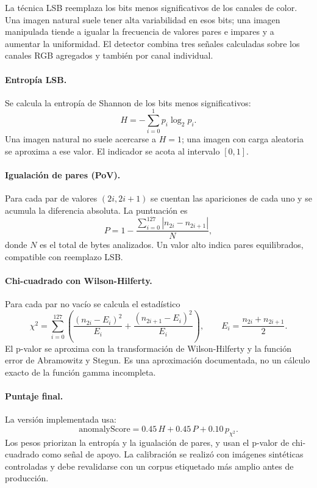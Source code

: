 \documentclass[11pt,a4paper]{article}
\begin{document}
La técnica LSB reemplaza los bits menos significativos de los canales de color. Una
imagen natural suele tener alta variabilidad en esos bits; una imagen manipulada
tiende a igualar la frecuencia de valores pares e impares y a aumentar la
uniformidad. El detector combina tres señales calculadas sobre los canales RGB
agregados y también por canal individual.

\paragraph{Entropía LSB.} Se calcula la entropía de Shannon de los bits menos
significativos:
\begin{equation}
  H = -\sum_{i=0}^{1} p_i \log_2 p_i .
\end{equation}
Una imagen natural no suele acercarse a $H=1$; una imagen con carga aleatoria se
aproxima a ese valor. El indicador se acota al intervalo $[0,1]$.

\paragraph{Igualación de pares (PoV).} Para cada par de valores $(2i, 2i+1)$ se
cuentan las apariciones de cada uno y se acumula la diferencia absoluta. La
puntuación es
\begin{equation}
  P = 1 - \frac{\sum_{i=0}^{127} |n_{2i} - n_{2i+1}|}{N},
\end{equation}
donde $N$ es el total de bytes analizados. Un valor alto indica pares equilibrados,
compatible con reemplazo LSB.

\paragraph{Chi-cuadrado con Wilson-Hilferty.} Para cada par no vacío se calcula el
estadístico
\begin{equation}
  \chi^2 = \sum_{i=0}^{127} \left(
    \frac{(n_{2i}-E_i)^2}{E_i} + \frac{(n_{2i+1}-E_i)^2}{E_i}
  \right), \qquad E_i = \frac{n_{2i}+n_{2i+1}}{2}.
\end{equation}
El p-valor se aproxima con la transformación de Wilson-Hilferty y la función error
de Abramowitz y Stegun. Es una aproximación documentada, no un cálculo exacto de la
función gamma incompleta.

\paragraph{Puntaje final.} La versión implementada usa:
\begin{equation}
  \text{anomalyScore} = 0.45\,H + 0.45\,P + 0.10\,p_{\chi^2}.
  \label{eq:score}
\end{equation}
Los pesos priorizan la entropía y la igualación de pares, y usan el p-valor de
chi-cuadrado como señal de apoyo. La calibración se realizó con imágenes sintéticas
controladas y debe revalidarse con un corpus etiquetado más amplio antes de
producción.
\end{document}
